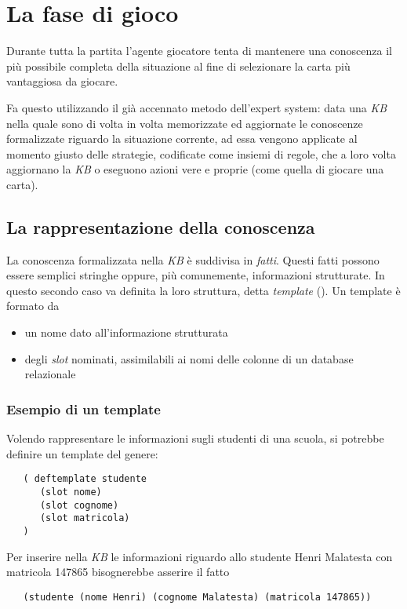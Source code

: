 \section{La fase di gioco}



Durante tutta la partita l'agente giocatore tenta di mantenere una conoscenza il più possibile completa della situazione al fine di selezionare la carta più vantaggiosa da giocare.

Fa questo utilizzando il già accennato metodo dell'expert system: data una \emph{KB} nella quale sono di volta in volta memorizzate ed aggiornate le conoscenze formalizzate riguardo la situazione corrente, ad essa vengono applicate al momento giusto delle strategie, codificate come insiemi di regole, che a loro volta aggiornano la \emph{KB} o eseguono azioni vere e proprie (come quella di giocare una carta).



\subsection{La rappresentazione della conoscenza}

La conoscenza formalizzata nella \emph{KB} è suddivisa in \emph{fatti}.
Questi fatti possono essere semplici stringhe oppure, più comunemente, informazioni strutturate.
In questo secondo caso va definita la loro struttura, detta \emph{template} (\cite{jessbook}).
Un template è formato da
\begin{itemize}
   \item un nome dato all'informazione strutturata
   \item degli \emph{slot} nominati, assimilabili ai nomi delle colonne di un database relazionale
\end{itemize}


\subsubsection*{Esempio di un template}
Volendo rappresentare le informazioni sugli studenti di una scuola, si potrebbe definire un template del genere:
\begin{verbatim}
   ( deftemplate studente 
      (slot nome)
      (slot cognome)
      (slot matricola)
   )
\end{verbatim}

Per inserire nella \emph{KB} le informazioni riguardo allo studente Henri Malatesta con matricola 147865 bisognerebbe asserire il fatto
\begin{verbatim}
   (studente (nome Henri) (cognome Malatesta) (matricola 147865))
\end{verbatim}


